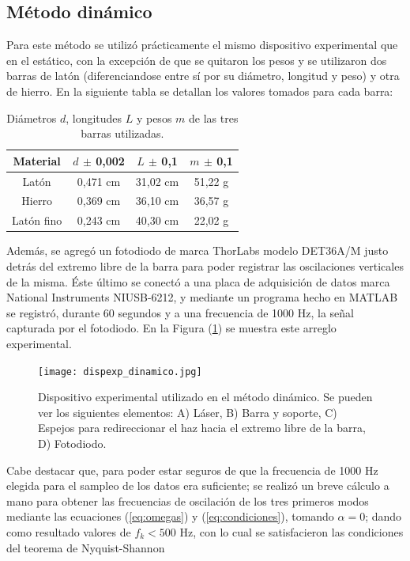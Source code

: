 \documentclass[twoside,twocolumn,a4paper]{article}
\begin{document}
\subsection{M\'etodo din\'amico}

Para este m\'etodo se utiliz\'o pr\'acticamente el mismo dispositivo experimental que en el est\'atico, con la excepci\'on de que se quitaron los pesos y se utilizaron dos barras de lat\'on (diferenciandose entre s\'i por su di\'ametro, longitud y peso) y otra de hierro. En la siguiente tabla se detallan los valores tomados para cada barra:\newline

\begin{table}[H]
\centering
\caption{Di\'ametros $d$, longitudes $L$ y pesos $m$ de las tres barras utilizadas.}
\label{tab:valoresbarras}
\begin{tabular}{|c|c|c|c|}
\hline
Material & $d$ $\pm$ 0,002 & $L$ $\pm$ 0,1 & $m$ $\pm$ 0,1\\ \hline
Lat\'on & 0,471 cm & 31,02 cm & 51,22 g\\ \hline
Hierro & 0,369 cm & 36,10 cm & 36,57 g  \\ \hline
Lat\'on fino & 0,243 cm & 40,30 cm & 22,02 g \\ \hline
\end{tabular}
\end{table}


Adem\'as, se agreg\'o un fotodiodo de  marca ThorLabs modelo DET36A/M justo detr\'as del extremo libre de la barra para poder registrar las oscilaciones verticales de la misma. \newline
\'Este \'ultimo se conect\'o a una placa de adquisici\'on de datos marca National Instruments NIUSB-6212, y mediante un programa hecho en MATLAB se registr\'o, durante 60 segundos y a una frecuencia de 1000 Hz, la se\~nal capturada por el fotodiodo. En la Figura (\ref{fig:dispexp_dinamico}) se muestra este arreglo experimental.

\begin{figure}[H]
\texttt{[image: dispexp\_dinamico.jpg]}
\caption{Dispositivo experimental utilizado en el m\'etodo din\'amico. Se pueden ver los siguientes elementos: A) L\'aser, B) Barra y soporte, C) Espejos para redireccionar el haz hacia el extremo libre de la barra, D) Fotodiodo.}
\label{fig:dispexp_dinamico}
\end{figure}

Cabe destacar que, para poder estar seguros de que la frecuencia de 1000 Hz elegida para el sampleo de los datos era suficiente; se realiz\'o un breve c\'alculo a mano para obtener las frecuencias de oscilaci\'on de los tres primeros modos mediante las ecuaciones (\ref{eq:omegas}) y (\ref{eq:condiciones}), tomando $\alpha = 0$; dando como resultado valores de $f_{k} < 500$ Hz, con lo cual se satisfacieron las condiciones del teorema de Nyquist-Shannon \cite{teo:shannon}
\end{document}
